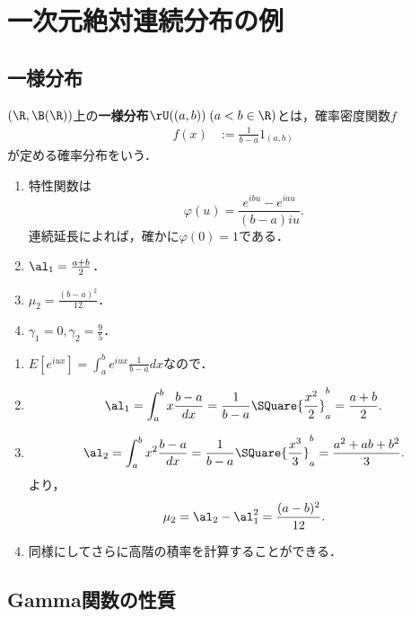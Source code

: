 \documentclass[uplatex,dvipdfmx]{jsreport}
\begin{document}
\section{一次元絶対連続分布の例}

\subsection{一様分布}

\begin{definition}
    $(\R,\B(\R))$上の\textbf{一様分布}$\rU((a,b))\;(a<b\in\R)$とは，確率密度関数$f$
    \begin{align*}
        f(x)&:=\frac{1}{b-a}1_{(a,b)}
    \end{align*}
    が定める確率分布をいう．
\end{definition}

\begin{proposition}\mbox{}
    \begin{enumerate}
        \item 特性関数は
        \[\varphi(u)=\frac{e^{ibu}-e^{iau}}{(b-a)iu}.\]
        連続延長によれば，確かに$\varphi(0)=1$である．
        \item $\al_1=\frac{a+b}{2}$．
        \item $\mu_2=\frac{(b-a)^2}{12}$．
        \item $\gamma_1=0,\gamma_2=\frac{9}{5}$．
    \end{enumerate}
\end{proposition}
\begin{Proof}\mbox{}
    \begin{enumerate}
        \item $E[e^{iux}]=\int^b_ae^{iux}\frac{1}{b-a}dx$なので．
        \item \[\al_1=\int_a^bx\frac{b-a}{dx}=\frac{1}{b-a}\SQuare{\frac{x^2}{2}}^b_a=\frac{a+b}{2}.\]
        \item \[\al_2=\int_a^bx^2\frac{b-a}{dx}=\frac{1}{b-a}\SQuare{\frac{x^3}{3}}^b_a=\frac{a^2+ab+b^2}{3}.\]
        より，
        \[\mu_2=\al_2-\al_1^2=\frac{(a-b)^2}{12}.\]
        \item 同様にしてさらに高階の積率を計算することができる．
    \end{enumerate}
\end{Proof}

\subsection{Gamma関数の性質}
\end{document}
